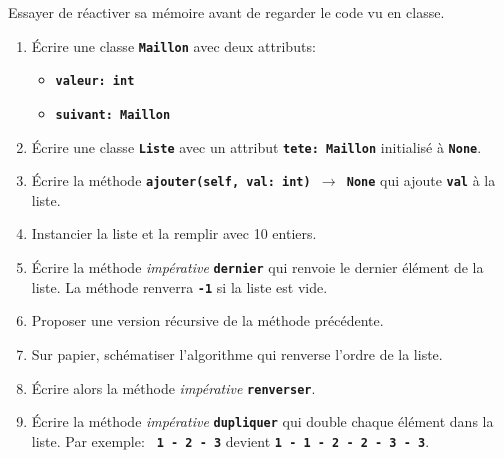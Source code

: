 \documentclass[a4paper,11pt]{article}
\begin{document}
\begin{exo}
    \begin{framed}
        Essayer de réactiver sa mémoire avant de regarder le code vu en classe.
    \end{framed}
    \begin{enumerate}
        \item Écrire une classe \textbf{\texttt{Maillon}} avec deux attributs:
              \begin{itemize}
                  \item \textbf{\texttt{valeur: int}}
                  \item \textbf{\texttt{suivant: Maillon}}
              \end{itemize}
        \item Écrire une classe \textbf{\texttt{Liste}} avec un attribut \textbf{\texttt{tete: Maillon}} initialisé à \textbf{\texttt{None}}.
        \item Écrire la méthode \textbf{\texttt{ajouter(self, val: int) $\rightarrow$ None}} qui ajoute \textbf{\texttt{val}} à la liste.
        \item Instancier la liste et la remplir avec 10 entiers.
        \item Écrire la méthode \emph{impérative} \textbf{\texttt{dernier}} qui renvoie le dernier élément de la liste. La méthode renverra \textbf{\texttt{-1}} si la liste est vide.
        \item Proposer une version récursive de la méthode précédente.
        \item Sur papier, schématiser l'algorithme qui renverse l'ordre de la liste.
        \item Écrire alors la méthode \emph{impérative} \textbf{\texttt{renverser}}.
        \item Écrire la méthode \emph{impérative} \textbf{\texttt{dupliquer}} qui double chaque élément dans la liste. Par exemple: \textbf{\texttt{ 1 - 2 - 3}} devient \textbf{\texttt{1 - 1 - 2 - 2 - 3 - 3}}.
    \end{enumerate}
\end{exo}
\end{document}
